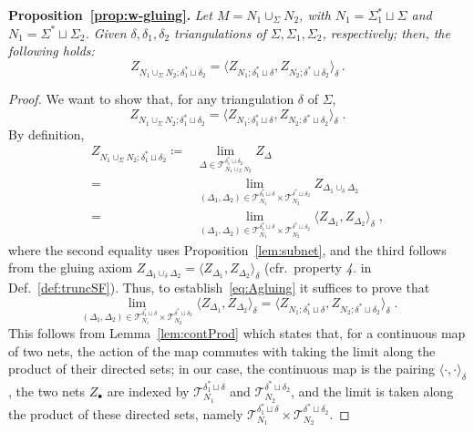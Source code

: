\documentclass[11pt]{article}
\theoremstyle{definition}
\numberwithin{equation}{section}
\begin{document}
\noindent
\textbf{Proposition~\ref{prop:w-gluing}.}\emph{
    Let $M=N_1\cup_\Sigma N_2$, with $N_1=\Sigma_1^*\sqcup\Sigma$ and $N_1=\Sigma^*\sqcup\Sigma_2$. Given $\delta,\delta_1,\delta_2$ triangulations of $\Sigma,\Sigma_1,\Sigma_2$, respectively; then, the following holds:
    \begin{equation*}
        Z_{N_1\cup_\Sigma N_2; \delta_1^* \sqcup \delta_2}= \langle Z_{N_1; \delta_1^* \sqcup \delta}, Z_{N_2; \delta^* \sqcup \delta_2} \rangle_\delta\,.
    \end{equation*}
}
\begin{proof}
    We want to show that, for any triangulation $\delta$ of $\Sigma$,
\begin{equation}
\label{eq:Agluing}
    Z_{N_1\cup_\Sigma N_2; \delta_1^* \sqcup \delta_2}= \langle Z_{N_1; \delta_1^* \sqcup \delta}, Z_{N_2; \delta^* \sqcup \delta_2} \rangle_\delta\;.
\end{equation}
By definition,
\begin{equation}
    \begin{split}
        Z_{N_1\cup_\Sigma N_2; \delta_1^* \sqcup \delta_2} \coloneqq & \lim_{\Delta \in \mathcal{T}_{N_1\cup_\Sigma N_2}^{\delta_1^* \sqcup \delta_2}} Z_{\Delta} \\ =& \lim_{(\Delta_1,\Delta_2) \in \mathcal{T}_{N_1}^{\delta_1^* \sqcup \delta}\times \mathcal{T}_{N_2}^{\delta^* \sqcup \delta_2}} Z_{\Delta_1\cup_\delta\Delta_2} \\ =& \lim_{(\Delta_1,\Delta_2) \in \mathcal{T}_{N_1}^{\delta_1^* \sqcup \delta}\times \mathcal{T}_{N_2}^{\delta^* \sqcup \delta_2}} \langle Z_{\Delta_1},Z_{\Delta_2}\rangle_\delta\;,
    \end{split}
\end{equation}
where the second equality uses Proposition~\ref{lem:subnet}, and the third follows from the gluing axiom $Z_{\Delta_1\cup_\delta\Delta_2}=\langle Z_{\Delta_1},Z_{\Delta_2}\rangle_\delta$ (cfr.~property \emph{4.} in Def.~\ref{def:truncSF}). Thus, to establish~\eqref{eq:Agluing} it suffices to prove that 
\begin{equation}
    \lim_{(\Delta_1,\Delta_2) \in \mathcal{T}_{N_1}^{\delta_1^* \sqcup \delta}\times \mathcal{T}_{N_2}^{\delta^* \sqcup \delta_2}} \langle Z_{\Delta_1},Z_{\Delta_2}\rangle_\delta= \langle Z_{N_1; \delta_1^* \sqcup \delta}, Z_{N_2; \delta^* \sqcup \delta_2} \rangle_\delta\;.
\end{equation}
This follows from Lemma~\ref{lem:contProd} which states that, for a continuous map of two nets, the action of the map commutes with taking the limit along the product of their directed sets; in our case, the continuous map is the pairing $\langle\cdot,\cdot\rangle_\delta$, the two nets $Z_{\bullet}$ are indexed by $\mathcal{T}_{N_1}^{\delta_1^* \sqcup \delta}$ and $\mathcal{T}_{N_2}^{\delta^* \sqcup \delta_2}$, and the limit is taken along the product of these directed sets, namely $\mathcal{T}_{N_1}^{\delta_1^* \sqcup \delta}\times \mathcal{T}_{N_2}^{\delta^* \sqcup \delta_2}$.
\end{proof}
\end{document}
